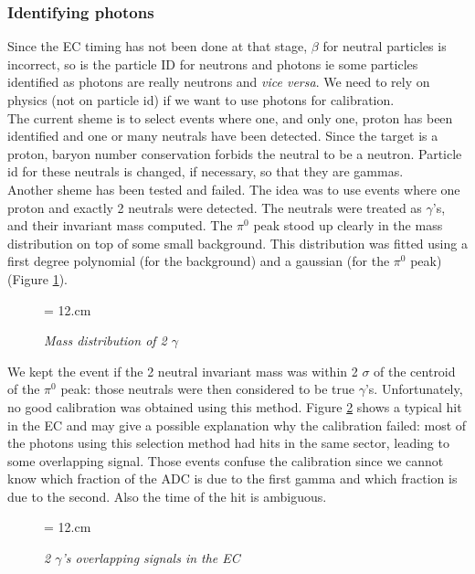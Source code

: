 \documentclass [12pt,letterpaper]{article}
\begin{document}
\subsubsection{Identifying photons}
Since the EC timing has not been done at that stage, $\beta$ for neutral particles is incorrect, so is the particle ID for neutrons and photons ie some particles identified as photons are really neutrons and {\it vice versa}. We need to rely on physics (not on particle id) if we want to use photons for calibration. \\
The current sheme is to select events where one, and only one, proton has been identified and one or many neutrals have been detected. Since the target is a proton, baryon number conservation forbids the neutral to be a neutron. Particle id for these neutrals is changed, if necessary, so that they are gammas.\\
Another sheme has been tested and failed. The idea was to use events where one proton and exactly 2 neutrals were detected. The neutrals were treated as $\gamma$'s,  and their invariant mass computed. The $\pi^{0}$ peak stood up clearly in the mass distribution on top of some small background. This distribution was fitted using a first degree polynomial (for the background) and a gaussian (for the $\pi^{0}$ peak) (Figure \ref{fig:pi0}).

\begin{figure} [h]
\begin{center}
\epsfxsize = 12.cm
\caption {\it Mass distribution of 2 $\gamma$}
\label{fig:pi0}
\end{center}
\end{figure}

We kept the event if the 2 neutral invariant mass was within 2 $\sigma$ of the centroid of the $\pi^{0}$ peak: those neutrals were then considered to be true $\gamma$'s. Unfortunately, no good calibration was obtained using this method. Figure \ref{fig:ec_overlap} shows a typical hit in the EC and may give a possible explanation why the calibration failed: most of the photons using this selection method had hits in the same sector, leading to some overlapping signal. Those events confuse the calibration since we cannot know which fraction of the ADC is due to the first gamma and which fraction is due to the second. Also the time of the hit is ambiguous.\\

\begin{figure} [h]
\begin{center}
\epsfxsize = 12.cm
\caption {\it 2 $\gamma$'s overlapping signals in the EC}
\label{fig:ec_overlap}
\end{center}
\end{figure}
\end{document}
